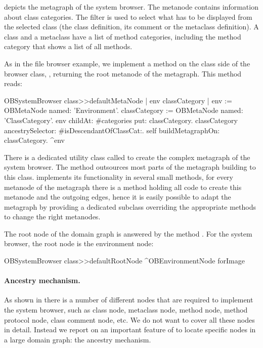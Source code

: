 \documentclass[a4paper,10pt,twoside]{book}
\begin{document}
 depicts the metagraph of the system browser. The metanode  contains information about class categories. The filter is used to select what has to be displayed from the selected class (\ie the class definition, its comment or the metaclass definition). A class and a metaclass have a list of method categories, including the  method category that shows a list of all methods.

As in the file browser example, we implement a method  on the class side of the browser class, \ie {}, returning the root metanode of the metagraph. This method reads:

\begin{code}{}
OBSystemBrowser class>>defaultMetaNode
	| env classCategory |
	env := OBMetaNode named: 'Environment'.
	classCategory := OBMetaNode named: 'ClassCategory'.
	env childAt: #categories put: classCategory.
	classCategory ancestrySelector: #isDescendantOfClassCat:.
	self buildMetagraphOn: classCategory.
	^env
\end{code}

There is a dedicated utility class called  to create the complex metagraph of the system browser. The method  outsources most parts of the metagraph building to this class.  implements its functionality in several small methods, \ie for every metanode of the metagraph there is a method holding all code to create this metanode and the outgoing edges, hence it is easily possible to adapt the metagraph by providing a dedicated subclass overriding the appropriate methods to change the right metanodes. 

The root node of the domain graph is answered by the method . For the system browser, the root node is the environment node:

\begin{code}{}
OBSystemBrowser class>>defaultRootNode
	^OBEnvironmentNode forImage
\end{code}


\paragraph{Ancestry mechanism.} As shown in  there is a number of different nodes that are required to implement the system browser, such as class node, metaclass node, method node, method protocol node, class comment node, etc. We do not want to cover all these nodes in detail. Instead we report on an important feature of \obf to locate specific nodes in a large domain graph: the ancestry mechanism. 
\end{document}
